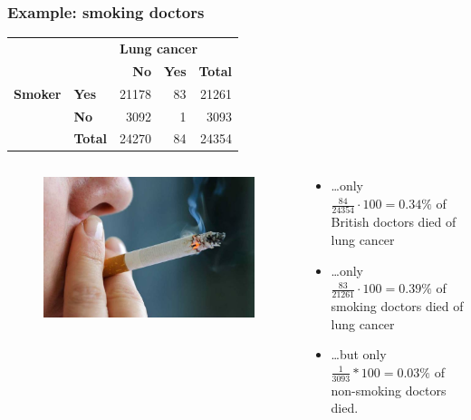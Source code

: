 \documentclass{beamer}
\begin{document}
\begin{frame}
  \frametitle{Example: smoking doctors}
  \begin{table}[h]
    \begin{tabular}{@{}|ll|rr|r|@{}}
        \toprule
        & & \multicolumn{3}{l|}{\textbf{Lung cancer}} \\
        & & \textbf{No} & \textbf{Yes} & \textbf{Total} \\ \midrule
        \textbf{Smoker} & \textbf{Yes}         & 21178       & 83           & 21261          \\
        & \textbf{No}          & 3092        & 1            & 3093           \\ \midrule
        & \textbf{Total}       & 24270       & 84           & 24354          \\ \bottomrule
    \end{tabular}
\end{table}

  \begin{columns}
    \begin{column}{0.3 \textwidth}
  
    \begin{figure}
      \centering
        \includegraphics[width=1.00\textwidth]{img/les-6-smoking.jpg}
    \end{figure}
  
    \end{column}
    \begin{column}{0.7 \textwidth}
  
    \begin{itemize}
      \item \dots only $\frac{84}{ 24354} \cdot 100 = 0.34\% $ of British doctors died of lung cancer
      \item \dots only $\frac{83}{21261} \cdot 100 = 0.39\%$ of smoking doctors died of lung cancer
      \item \dots but only $\frac{1}{3093} * 100 = 0.03\%$ of non-smoking doctors died.
    \end{itemize}
    \end{column}
  \end{columns}
\end{frame}
\end{document}
